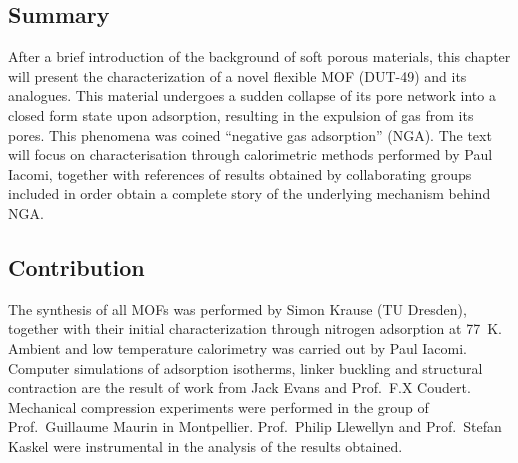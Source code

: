 \subsection*{Summary}

After a brief introduction of the background of soft porous 
materials, this chapter will present the characterization of a novel
flexible MOF (DUT-49) and its analogues. This material undergoes
a sudden collapse of its pore network into a closed form state
upon adsorption, resulting in the expulsion of gas from its pores.
This phenomena was coined ``negative gas adsorption'' (NGA).
The text will focus on characterisation through calorimetric methods
performed by Paul Iacomi, together with references
of results obtained by collaborating groups included in order
obtain a complete story of the underlying mechanism behind NGA.

\subsection*{Contribution}

The synthesis of all MOFs was performed by Simon Krause
(TU Dresden), together with their initial characterization through 
nitrogen adsorption at \SI{77}{\kelvin}.
Ambient and low temperature calorimetry was carried out by 
Paul Iacomi. Computer simulations of adsorption isotherms, 
linker buckling and structural contraction
are the result of work from Jack Evans and Prof.\ F.X Coudert.
Mechanical compression experiments were performed in 
the group of Prof.\ Guillaume Maurin in Montpellier. 
Prof.\ Philip Llewellyn and Prof.\ Stefan Kaskel were 
instrumental in the analysis of the results obtained.

